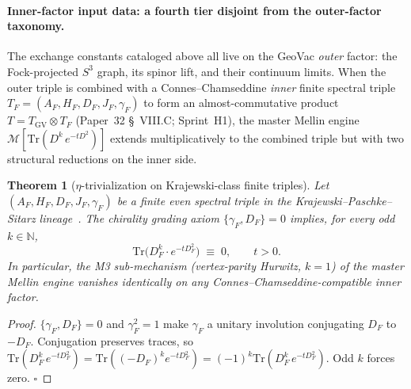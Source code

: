 \documentclass[aps,pra,twocolumn,superscriptaddress,longbibliography]{revtex4-2}
\newtheorem{theorem}{Theorem}
\begin{document}
\paragraph{Inner-factor input data: a fourth tier disjoint from
the outer-factor taxonomy.}
The exchange constants cataloged above all live on the GeoVac
\emph{outer} factor: the Fock-projected $S^3$ graph, its spinor
lift, and their continuum limits.  When the outer triple is
combined with a Connes--Chamseddine \emph{inner} finite spectral
triple $T_F = (A_F, H_F, D_F, J_F, \gamma_F)$ to form an
almost-commutative product $T = T_{\mathrm{GV}} \otimes T_F$
(Paper~32 \S~VIII.C; Sprint~H1), the master Mellin engine
$\mathcal{M}[\mathrm{Tr}(D^k\,e^{-tD^2})]$ extends multiplicatively
to the combined triple but with two structural reductions on the
inner side.

\begin{theorem}[$\eta$-trivialization on Krajewski-class finite
triples]
\label{thm:eta_trivialization}
Let $(A_F, H_F, D_F, J_F, \gamma_F)$ be a finite even spectral triple
in the Krajewski--Paschke--Sitarz lineage~\cite{krajewski1998,
paschke_sitarz2000}.  The chirality grading axiom
$\{\gamma_F, D_F\} = 0$ implies, for every odd $k \in \mathbb{N}$,
\begin{equation}\label{eq:eta_trivial}
  \mathrm{Tr}\bigl(D_F^k \cdot e^{-t D_F^2}\bigr) \;\equiv\; 0,
  \qquad t > 0.
\end{equation}
In particular, the M3 sub-mechanism (vertex-parity Hurwitz, $k=1$)
of the master Mellin engine vanishes identically on any
Connes--Chamseddine-compatible inner factor.
\end{theorem}

\begin{proof}
$\{\gamma_F, D_F\} = 0$ and $\gamma_F^2 = 1$ make $\gamma_F$ a unitary
involution conjugating $D_F$ to $-D_F$.  Conjugation preserves
traces, so $\mathrm{Tr}(D_F^k\,e^{-tD_F^2}) = \mathrm{Tr}((-D_F)^k
e^{-tD_F^2}) = (-1)^k \mathrm{Tr}(D_F^k\,e^{-tD_F^2})$.  Odd $k$
forces zero. $\square$
\end{proof}
\end{document}
